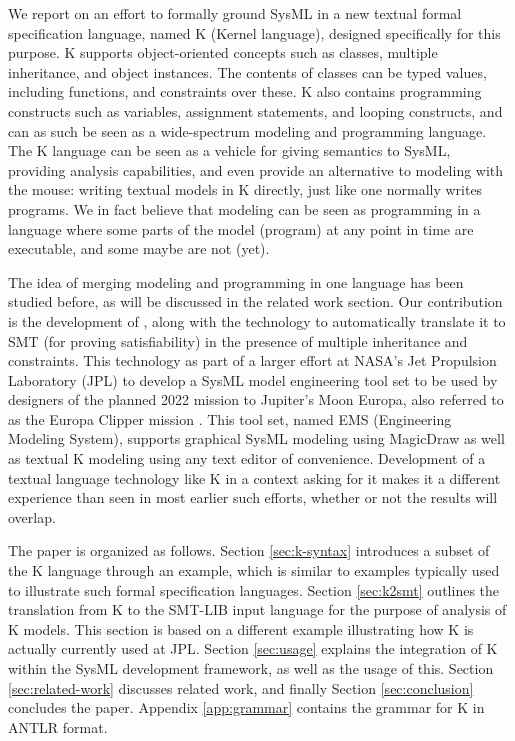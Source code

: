 We report on an effort to formally ground SysML in a new textual
formal specification language, named K (Kernel language), designed
specifically for this purpose.  K supports object-oriented concepts
such as classes, multiple inheritance, and object instances. The
contents of classes can be typed values, including functions, and
constraints over these. K also contains programming constructs such as
variables, assignment statements, and looping constructs, and can as
such be seen as a wide-spectrum modeling and programming language.
The K language can be seen as a vehicle for giving semantics to SysML,
providing analysis capabilities, and even provide an alternative to
modeling with the mouse: writing textual models in K directly, just
like one normally writes programs.  We in fact believe that modeling
can be seen as programming in a language where some parts of the
model (program) at any point in time are executable, and some maybe
are not (yet).

The idea of merging modeling and programming in one language has been
studied before, as will be discussed in the related work section. Our
contribution is the development of \Klang{}, along with the technology
to automatically translate it to SMT (for proving satisfiability) in
the presence of multiple inheritance and constraints. This technology
as part of a larger effort at NASA's Jet Propulsion Laboratory (JPL)
to develop a SysML model engineering tool set to be used by designers
of the planned 2022 mission to Jupiter's Moon Europa, also referred to
as the Europa Clipper mission \cite{europa-clipper}. This tool set,
named EMS (Engineering Modeling System), supports graphical SysML
modeling using MagicDraw \cite{magicdraw} as well as textual K
modeling using any text editor of convenience. Development of a
textual language technology like K in a context asking for it makes it
a different experience than seen in most earlier such efforts, whether
or not the results will overlap.

The paper is organized as follows. Section \ref{sec:k-syntax}
introduces a subset of the K language through an example, which is
similar to examples typically used to illustrate such formal
specification languages. Section \ref{sec:k2smt} outlines the
translation from K to the SMT-LIB input language for the purpose of
analysis of K models. This section is based on a different example
illustrating how K is actually currently used at JPL. Section
\ref{sec:usage} explains the integration of K within the SysML
development framework, as well as the usage of this. Section
\ref{sec:related-work} discusses related work, and finally Section
\ref{sec:conclusion} concludes the paper. Appendix \ref{app:grammar}
contains the grammar for K in ANTLR \cite{antlr} format.
